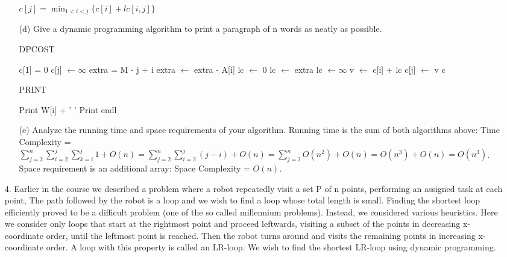 \documentclass{article}       %
\begin{document}
\begin{enumerate}
\begin{enumerate}
		$c[j] = \min_{1<i<j} \{c[i] + lc[i, j]\}$\newline
		\item[(d)] Give a dynamic programming algorithm to print a paragraph of n words as neatly as possible.
		\begin{algorithm}[H]
	\caption{DPCOST}
	\small
	\begin{algorithmic}[1]
		\State c[1] = 0
		\State c[j] $\gets \infty$
		\State extra = M - j + i
		\State extra $\gets$ extra - A[i]
		\EndFor
		\State lc $\gets$ 0
		\EndIf
		\State lc $\gets$ extra
		\EndIf
		\State lc $\gets \infty$  
		\EndIf
		\State v $\gets$ c[i] + lc
			\State c[j] $\gets$ v
			\EndIf
		\EndFor
		\EndFor
		\State \Return c
		\EndProcedure
		\end{algorithmic}\label{p2}
	\end{algorithm}
	\begin{algorithm}[H]
		\caption{PRINT}
		\small
		\begin{algorithmic}[1]
			\State Print W[i] + ' '
			\State Print endl
			\EndIf
			\EndFor
			\EndProcedure
		\end{algorithmic}\label{p1}
	\end{algorithm}
		\item[(e)] Analyze the running time and space requirements of your algorithm.\newline\newline
		Running time is the sum of both algorithms above:\newline
		Time Complexity = $\sum_{j=2}^{n}\sum_{i=2}^{j}\sum_{k=i}^{j} 1 + O(n) = \sum_{j=2}^{n}\sum_{i=2}^{j} (j-i) + O(n) = \sum_{j=2}^{n} O(n^2) + O(n) = O(n^3) + O(n) = O(n^3)$.\newline
		Space requirement is an additional array:\newline
		Space Complexity = $O(n)$.\newline
	\end{enumerate}	
	\item[4.] Earlier in the course we described a problem where a robot repeatedly visit a set P of n points, performing an assigned task at each point, The path followed by the robot is a loop and we wish to find a loop whose total length is small. Finding the shortest loop efficiently proved to be a difficult problem (one of the so called millennium problems). Instead, we considered various heuristics. Here we consider only loops that start at the rightmost point and proceed leftwards, visiting a subset of the points in decreasing x-coordinate order, until the leftmost point is reached. Then the robot turns around and visits the remaining points in increasing x-coordinate order. A loop with this property is called an LR-loop. We wish to find the shortest LR-loop using dynamic programming.	

\end{enumerate}
\end{document}

